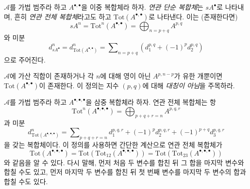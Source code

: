 \begin{definition}
\label{definition-associated-simple-complex}
$\mathcal{A}$를 가법 범주라 하고 $A^{\bullet, \bullet}$을 이중
복합체라 하자. {\it 연관 단순 복합체}는 $sA^\bullet$로 나타내며,
흔히 {\it 연관 전체 복합체}라고도 하고
$\text{Tot}(A^{\bullet, \bullet})$로 나타낸다. 이는 (존재한다면)
$$
sA^n = \text{Tot}^n(A^{\bullet, \bullet}) =
\bigoplus\nolimits_{n = p + q} A^{p, q}
$$
와 미분
$$
d_{sA^\bullet}^n = d_{\text{Tot}(A^{\bullet, \bullet})}^n =
\sum\nolimits_{n = p + q} (d_1^{p, q} + (-1)^p d_2^{p, q})
$$
으로 주어진다.
\end{definition}

\noindent
$\mathcal{A}$에 가산 직합이 존재하거나 각 $n$에 대해 영이 아닌
$A^{p, n - p}$가 유한 개뿐이면
$\text{Tot}(A^{\bullet, \bullet})$이 존재한다.
이 정의는 지수 $(p, q)$에 대해 {\it 대칭이 아님}을 주목하라.

\begin{remark}
\label{remark-triple-complex}
$\mathcal{A}$를 가법 범주라 하고
$A^{\bullet, \bullet, \bullet}$을 삼중 복합체라 하자.
연관 전체 복합체는 항
$$
\text{Tot}^n(A^{\bullet, \bullet, \bullet}) =
\bigoplus\nolimits_{p + q + r = n} A^{p, q, r}
$$
과 미분
$$
d^n_{\text{Tot}(A^{\bullet, \bullet, \bullet})} =
\sum\nolimits_{p + q + r = n}
d_1^{p, q, r} + (-1)^pd_2^{p, q, r} + (-1)^{p + q}d_3^{p, q, r}
$$
을 갖는 복합체이다. 이 정의를 사용하면 간단한 계산으로 연관 전체
복합체가
$$
\text{Tot}(A^{\bullet, \bullet, \bullet}) =
\text{Tot}(\text{Tot}_{12}(A^{\bullet, \bullet, \bullet})) =
\text{Tot}(\text{Tot}_{23}(A^{\bullet, \bullet, \bullet}))
$$
와 같음을 알 수 있다. 다시 말해, 먼저 처음 두 변수를 합친 뒤 그
합을 마지막 변수와 합칠 수도 있고, 먼저 마지막 두 변수를 합친 뒤
첫 번째 변수를 마지막 두 변수의 합과 합칠 수도 있다.
\end{remark}

